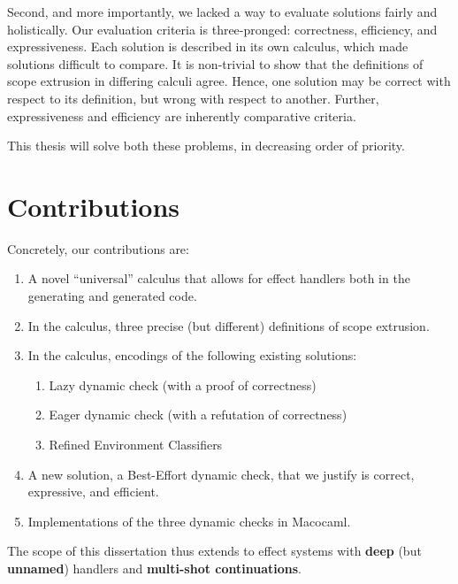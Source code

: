 Second, and more importantly, we lacked a way to evaluate solutions fairly and holistically. Our evaluation criteria is three-pronged: correctness, efficiency, and expressiveness. Each solution is described in its own calculus, which made solutions difficult to compare. It is non-trivial to show that the definitions of scope extrusion in differing calculi agree. Hence, one solution may be correct with respect to its definition, but wrong with respect to another. Further, expressiveness and efficiency are inherently comparative criteria.

This thesis will solve both these problems, in decreasing order of priority. 

\section{Contributions}
Concretely, our contributions are:
\begin{enumerate}
    \item A novel ``universal'' calculus that allows for effect handlers both in the generating and generated code.
    \item In the calculus, three precise (but different) definitions of scope extrusion.  
    \item In the calculus, encodings of the following existing solutions: 
    \begin{enumerate} 
        \item Lazy dynamic check (with a proof of correctness)
        \item Eager dynamic check (with a refutation of correctness)
        \item Refined Environment Classifiers
    \end{enumerate}
    \item A new solution, a Best-Effort dynamic check, that we justify is correct, expressive, and efficient.
    \item Implementations of the three dynamic checks in Macocaml.
\end{enumerate}

The scope of this dissertation thus extends to effect systems with \textbf{deep} (but \textbf{unnamed}) handlers and \textbf{multi-shot continuations}.